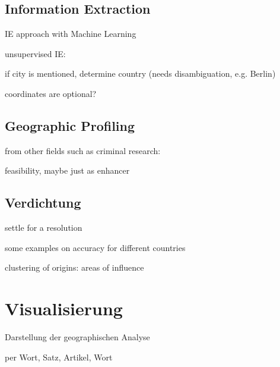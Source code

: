 \subsection{Information Extraction}

\begin{todos}
    \item IE approach with Machine Learning 
    \item unsupervised IE: 
    \item if city is mentioned, determine country (needs disambiguation, e.g. Berlin)
    \item coordinates are optional?
\end{todos}


\subsection{Geographic Profiling}

\begin{todos}
    \item {}
    \item {}
    \item from other fields such as criminal research: \\ 
    \item feasibility, maybe just as enhancer
\end{todos}


\subsection{Verdichtung}

\begin{todos}
    \item settle for a resolution
    \item some examples on accuracy for different countries
    \item clustering of origins: areas of influence
\end{todos}



\section{Visualisierung}

\begin{todos}
    \item Darstellung der geographischen Analyse
    \item per Wort, Satz, Artikel, Wort
\end{todos}

